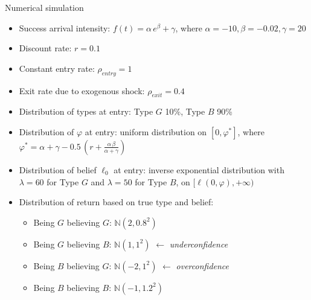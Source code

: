 \documentclass{beamer}
\begin{document}
\begin{frame}[allowframebreaks]{Numerical simulation}
	\begin{itemize}
\item Success arrival intensity: $f(t)=\alpha \, e^\beta + \gamma$, where $\alpha = -10, \beta = -0.02, \gamma = 20$
\item Discount rate: $r = 0.1$
\item Constant entry rate: $\rho_{entry} = 1$
\item Exit rate due to exogenous shock: $\rho_{exit} = 0.4$
\end{itemize}

\framebreak

\begin{itemize}
\item Distribution of types at entry: Type $G$ 10\%, Type $B$ 90\%
\item Distribution of $\varphi$ at entry: uniform distribution on $[0, \varphi^*]$, where $\varphi^* = \alpha + \gamma - 0.5 \, (r + \frac{\alpha \, \beta}{\alpha + \gamma})$
\item Distribution of belief $\ell_0$ at entry: inverse exponential distribution with $\lambda = 60$ for Type $G$ and $\lambda = 50$ for Type $B$, on $[\ell(0, \varphi), +\infty)$
\item Distribution of return based on true type and belief:
\begin{itemize}
	\item Being $G$ believing $G$: $\mathbb N(2, 0.8^2)$
	\item Being $G$ believing $B$: $\mathbb N(1, 1^2)$
	$\leftarrow$ \textit{underconfidence}
	\item Being $B$ believing $G$: $\mathbb N(-2, 1^2)$
	$\leftarrow$ \textit{overconfidence}
	\item Being $B$ believing $B$: $\mathbb N(-1, 1.2^2)$
\end{itemize}
	\end{itemize}
\end{frame}
\end{document}
